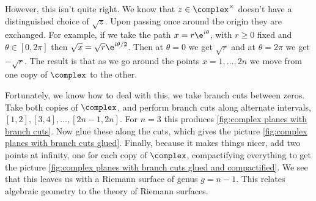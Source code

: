 \documentclass[fleqn]{NotesClass}
\begin{document}
    However, this isn't quite right.
    We know that \(z \in \complex^{\times}\) doesn't have a distinguished choice of \(\sqrt{z}\).
    Upon passing once around the origin they are exchanged.
    For example, if we take the path \(x = r\e^{i\theta}\), with \(r \ge 0\) fixed and \(\theta \in [0, 2\pi]\) then \(\sqrt{x} = \sqrt{r} \e^{i\theta/2}\).
    Then at \(\theta = 0\) we get \(\sqrt{r}\) and at \(\theta = 2\pi\) we get \(-\sqrt{r}\).
    The result is that as we go around the points \(x = 1, \dotsc, 2n\) we move from one copy of \(\complex\) to the other.
    
    Fortunately, we know how to deal with this, we take branch cuts between zeros.
    Take both copies of \(\complex\), and perform branch cuts along alternate intervals, \([1, 2], [3, 4], \dotsc, [2n - 1, 2n]\).
    For \(n = 3\) this produces \cref{fig:complex planes with branch cuts}.
    Now glue these along the cuts, which gives the picture \cref{fig:complex planes with branch cuts glued}.
    Finally, because it makes things nicer, add two points at infinity, one for each copy of \(\complex\), compactifying everything to get the picture \cref{fig:complex planes with branch cuts glued and compactified}.
    We see that this leaves us with a Riemann surface of genus \(g = n - 1\).
    This relates algebraic geometry to the theory of Riemann surfaces.
    
\end{document}
